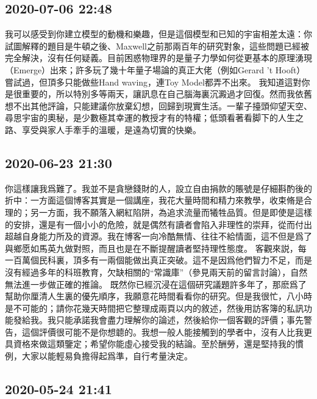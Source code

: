 \documentclass[twocolumn]{ctexart}
\begin{document}
\subsection*{2020-07-06 22:48}

我可以感受到你建立模型的動機和樂趣，但是這個模型和已知的宇宙相差太遠：你試圖解釋的題目是牛頓之後、Maxwell之前那兩百年的研究對象，這些問題已經被完全解決，沒有任何疑義。目前困惑物理界的是量子力學如何從更基本的原理湧現（Emerge）出來；許多玩了幾十年量子場論的真正大佬（例如Gerard 't Hooft）嘗試過，但頂多只能做些Hand waving，連Toy Model都弄不出來。
我知道這對你是很重要的，所以特別多等兩天，讓訊息在自己腦海裏沉澱過才回復。然而我依舊想不出其他評論，只能建議你放棄幻想，回歸到現實生活。一輩子擡頭仰望天空、尋思宇宙的奧秘，是少數極其幸運的教授才有的特權；低頭看著看脚下的人生之路、享受與家人手牽手的溫暖，是遠為切實的快樂。
\subsection*{2020-06-23 21:30}

你這樣讓我爲難了。我並不是貪戀錢財的人，設立自由捐款的賬號是仔細斟酌後的折中：一方面這個博客其實是一個講座，我花大量時間和精力來教學，收束脩是合理的；另一方面，我不願落入網紅陷阱，為追求流量而犧牲品質。但是即使是這樣的安排，還是有一個小小的危險，就是偶然有讀者會陷入非理性的崇拜，從而付出超越自身能力所及的資源。我在博客一向冷酷無情、往往不給情面，這不但是爲了與鄉愿如馬英九做對照，而且也是在不斷提醒讀者堅持理性態度。
客觀來説，每一百萬個民科裏，頂多有一兩個能做出真正突破。這不是因爲他們智力不足，而是沒有經過多年的科班教育，欠缺相關的“常識庫”（參見兩天前的留言討論），自然無法進一步做正確的推論。
既然你已經沉浸在這個研究議題許多年了，那麽爲了幫助你厘清人生裏的優先順序，我願意花時間看看你的研究。但是我很忙，八小時是不可能的；請你花幾天時間把它整理成兩頁以内的敘述，然後用訪客簿的私訊功能發給我。我只能承諾我會盡力理解你的論述，然後給你一個客觀的評價；事先警告，這個評價很可能不是你想聼的。我想一般人能接觸到的學者中，沒有人比我更具資格來做這類鑒定；希望你能虛心接受我的結論。至於酬勞，還是堅持我的慣例，大家以能輕易負擔得起爲準，自行考量決定。
\subsection*{2020-05-24 21:41}
\end{document}
